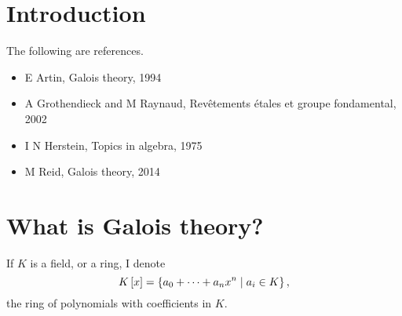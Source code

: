 \def\module{M3P11 Galois Theory}
\def\lecturer{Prof Alessio Corti}
\def\term{Spring 2019}

\def\thm{section}







\section{Introduction}


The following are references.
\begin{itemize}
\item E Artin, Galois theory, 1994
\item A Grothendieck and M Raynaud, Rev\^etements \'etales et groupe fondamental, 2002
\item I N Herstein, Topics in algebra, 1975
\item M Reid, Galois theory, 2014
\end{itemize}

\pagebreak

\section{What is Galois theory?}

\begin{notation1}
If $ K $ is a field, or a ring, I denote
$$ K\left[ x \right] = \left\{ a_0 + \dots + a_nx^n \mid a_i \in K \right\}, $$
the ring of polynomials with coefficients in $ K $.
\end{notation1}


